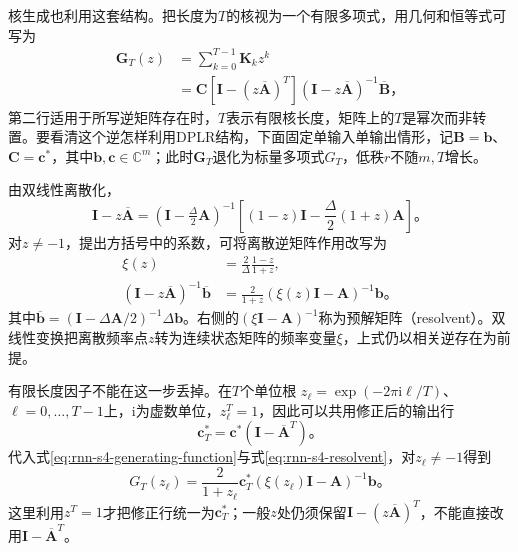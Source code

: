 核生成也利用这套结构。把长度为$T$的核视为一个有限多项式，用几何和恒等式可写为
\begin{equation}
  \begin{aligned}
    \bm{G}_T(z)&=\sum_{k=0}^{T-1}\bm{K}_k z^k\\
      &=\bm{C}\left[\bm{I}-(z\overline{\bm{A}})^T\right]
         (\bm{I}-z\overline{\bm{A}})^{-1}\overline{\bm{B}}\text{，}
  \end{aligned}
  \label{eq:rnn-s4-generating-function}
\end{equation}
第二行适用于所写逆矩阵存在时，$T$表示有限核长度，矩阵上的$T$是幂次而非转置。要看清这个逆怎样利用DPLR结构，下面固定单输入单输出情形，记$\bm B=\bm b$、$\bm C=\bm c^*$，其中$\bm b,\bm c\in\mathbb C^m$；此时$\bm G_T$退化为标量多项式$G_T$，低秩$r$不随$m,T$增长。

由双线性离散化，
\[
  \bm I-z\overline{\bm A}
    =(\bm I-\tfrac{\Delta}{2}\bm A)^{-1}
      \left[(1-z)\bm I-\frac{\Delta}{2}(1+z)\bm A\right]\text{。}
\]
对$z\neq-1$，提出方括号中的系数，可将离散逆矩阵作用改写为
\begin{equation}
  \begin{aligned}
    \xi(z)&=\frac{2}{\Delta}\frac{1-z}{1+z},\\
    (\bm I-z\overline{\bm A})^{-1}\overline{\bm b}
      &=\frac{2}{1+z}(\xi(z)\bm I-\bm A)^{-1}\bm b\text{。}
  \end{aligned}
  \label{eq:rnn-s4-resolvent}
\end{equation}
其中$\overline{\bm b}=(\bm I-\Delta\bm A/2)^{-1}\Delta\bm b$。右侧的$(\xi\bm I-\bm A)^{-1}$称为预解矩阵（resolvent）。双线性变换把离散频率点$z$转为连续状态矩阵的频率变量$\xi$，上式仍以相关逆存在为前提。

有限长度因子不能在这一步丢掉。在$T$个单位根
$z_\ell=\exp(-2\pi\mathrm i\ell/T)$、$\ell=0,\ldots,T-1$上，$\mathrm i$为虚数单位，$z_\ell^T=1$，因此可以共用修正后的输出行
\begin{equation}
  \bm c_T^*=\bm c^*(\bm I-\overline{\bm A}^{T})\text{。}
  \label{eq:rnn-s4-finite-readout}
\end{equation}
代入式\eqref{eq:rnn-s4-generating-function}与式\eqref{eq:rnn-s4-resolvent}，对$z_\ell\neq-1$得到
\begin{equation}
  G_T(z_\ell)=\frac{2}{1+z_\ell}
    \bm c_T^*(\xi(z_\ell)\bm I-\bm A)^{-1}\bm b\text{。}
  \label{eq:rnn-s4-root-evaluation}
\end{equation}
这里利用$z^T=1$才把修正行统一为$\bm c_T^*$；一般$z$处仍须保留$\bm I-(z\overline{\bm A})^T$，不能直接改用$\bm I-\overline{\bm A}^T$。

